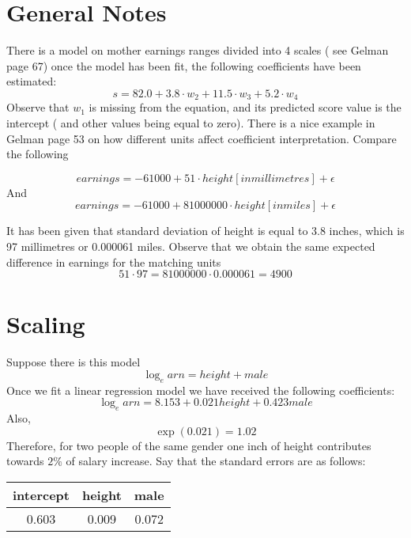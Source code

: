 \documentclass{article}
\begin{document}
\section{General Notes}
There is a model on mother earnings ranges divided into 4 scales ( see Gelman page 67)
once the model has been fit, the following coefficients have been estimated:
\begin{equation}
s = 82.0 + 3.8 \cdot w_2 + 11.5 \cdot w_3 + 5.2 \cdot w_4
\end{equation}
Observe that $w_1$ is missing from the equation, and its predicted score value is the intercept ( and other values being equal to zero).
There is a nice example in Gelman page 53 on how different units affect coefficient interpretation. Compare the following

\begin{equation}
earnings = -61000 + 51 \cdot height[in millimetres] + \epsilon
\end{equation}
And
\begin{equation}
 earnings = -61000 + 81000000 \cdot height[in miles] + \epsilon
\end{equation}

It has been given that standard deviation of height is equal to 3.8 inches, which is 97 millimetres or 0.000061 miles. Observe that we obtain the same expected difference in earnings for the matching units
\begin{equation}
51 \cdot 97 = 81000000 \cdot 0.000061 = 4900
\end{equation}

\section{Scaling}

Suppose there is this model
\begin{equation}
\log_earn = height + male
\end{equation}
Once we fit a linear regression model we have received the following coefficients:
\begin{equation}
\log_earn = 8.153 + 0.021height + 0.423male
\end{equation}
Also,
\begin{equation}
 \exp(0.021) = 1.02
\end{equation}
Therefore, for two people of the same gender one inch of height contributes towards $2\%$ of salary increase. Say that the standard errors are as follows:
\begin{tabular}{|c|c|c|}
\hline 
intercept& height & male \\ \hline 
0.603 & 0.009  & 0.072\\ 
\hline 
\end{tabular} 
\end{document}
